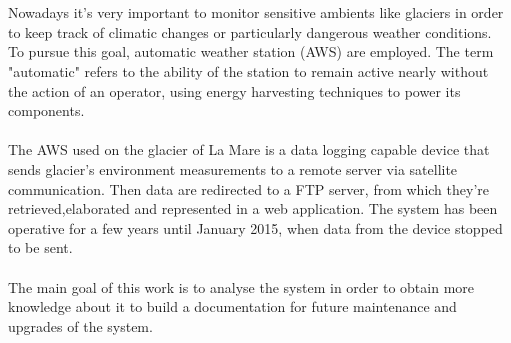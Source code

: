 \section*{}
\paragraph{}
Nowadays it's very important to monitor sensitive ambients like glaciers in order to keep track of climatic changes or particularly dangerous weather conditions. To pursue this goal, automatic weather station (AWS) are employed. The term "automatic" refers to the ability of the station to remain active nearly without the action of an operator, using energy harvesting techniques to power its components.
\paragraph{}
The AWS used on the glacier of La Mare is a data logging capable device that sends glacier's environment measurements to a remote server via satellite communication. Then data are redirected to a FTP server, from which they're retrieved,elaborated and represented in a web application. The system has been operative for a few years until January 2015, when data from the device stopped to be sent.
\paragraph{}
The main goal of this work is to analyse the system in order to obtain more knowledge about it to build a documentation for future maintenance and upgrades of the system.
\clearpage
